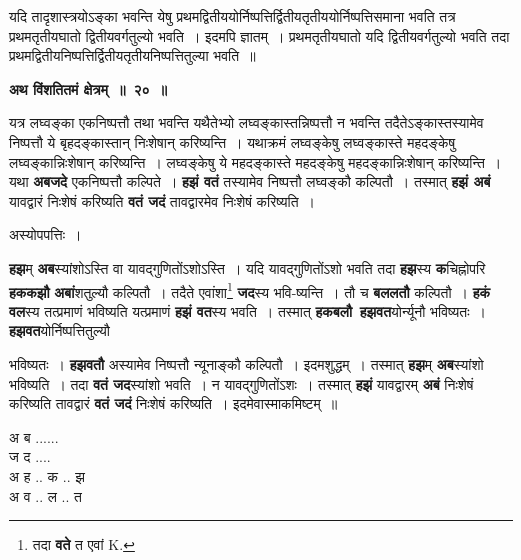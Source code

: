 \documentclass[11pt, openany]{book}
\begin{document}
यदि तादृशास्त्रयोऽङ्का भवन्ति येषु प्रथमद्वितीययोर्निष्पत्तिर्द्वितीयतृतीययोर्निष्पत्तिसमाना भवति तत्र प्रथमतृतीयघातो द्वितीयवर्गतुल्यो भवति~। इदमपि ज्ञातम्~। प्रथमतृतीयघातो यदि द्वितीयवर्गतुल्यो भवति तदा प्रथमद्वितीयनिष्पत्तिर्द्वितीयतृतीयनिष्पत्तितुल्या भवति~॥
\vspace{2mm}

\begin{center}
\textbf{\large  अथ विंशतितमं क्षेत्रम्~॥~२०~॥}
\end{center}

{\ab यत्र लघ्वङ्का एकनिष्पत्तौ तथा भवन्ति यथैतेभ्यो लघ्वङ्कास्तन्निष्पत्तौ न भवन्ति तदैतेऽङ्कास्तस्यामेव निष्पत्तौ  ये बृहदङ्कास्तान् निःशेषान् करिष्यन्ति~। यथाक्रमं लघ्वङ्केषु लघ्वङ्कास्ते महदङ्केषु लघ्वङ्कान्निःशेषान् करिष्यन्ति~। लघ्वङ्केषु ये महदङ्कास्ते महदङ्केषु महदङ्कान्निःशेषान् करिष्यन्ति~। }\\

 यथा \textbf{अबजदे} एकनिष्पत्तौ कल्पिते~। \textbf{हझं वतं} तस्यामेव निष्पत्तौ लघ्वङ्कौ कल्पितौ~। तस्मात् \textbf{हझं अबं} यावद्वारं निःशेषं करिष्यति \textbf{वतं जदं} तावद्वारमेव निःशेषं करिष्यति~। 

\newpage
\begin{center}
अस्योपपत्तिः~।
\end{center}

\textbf{हझ}म् \textbf{अब}स्यांशोऽस्ति वा यावद्गुणितोंऽशोऽस्ति~। यदि यावद्गुणितोंऽशो भवति तदा \textbf{हझ}स्य \textbf{क}चिह्नोपरि \textbf{हककझौ} \textbf{अबां}शतुल्यौ कल्पितौ~। तदैते एवांशा\renewcommand{\thefootnote}{१}\footnote{तदा \textbf{वते} त एवां {\en K.}} \textbf{जद}स्य भवि-ष्यन्ति~। तौ च \textbf{बललतौ} कल्पितौ~। \textbf{हकं वल}स्य तत्प्रमाणं भविष्यति यत्प्रमाणं  \textbf{हझं वत}स्य भवति~। तस्मात् \textbf{हकबलौ \,हझवत}योर्न्यूनौ भविष्यतः~। \textbf{हझवत}योर्निष्पत्तितुल्यौ
\vspace{-3mm}

\begin{flushleft}
\begin{minipage}[t]{0.7\textwidth}
 भविष्यतः~। \textbf{हझवतौ} अस्यामेव निष्पत्तौ न्यूनाङ्कौ कल्पितौ~। इदमशुद्धम्~। तस्मात् \textbf{हझ}म् \textbf{अब}स्यांशो भविष्यति~। तदा \textbf{वतं जद}स्यांशो भवति~। न यावद्गुणितोंऽशः~। तस्मात् \textbf{हझं} यावद्वारम् \textbf{अबं} निःशेषं करिष्यति तावद्वारं \textbf{वतं जदं} निःशेषं करिष्यति~। इदमेवास्माकमिष्टम्~॥ 
\end{minipage} 
\hfill
\begin{minipage}[t]{0.2\textwidth}
अ ब ......\\
ज द .... \\
{\color{white}अ} ह .. क .. झ\\ 
{\color{white}अ} व .. ल .. त
\end{minipage}
\end{flushleft}
\vspace{-1mm}
\end{document}
